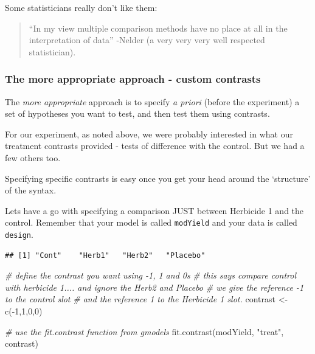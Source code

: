 \documentclass[
]{book}
\newenvironment{Shaded}{\begin{snugshade}}{\end{snugshade}}
\newcommand{\CommentTok}[1]{\textcolor[rgb]{0.56,0.35,0.01}{\textit{#1}}}
\newcommand{\DecValTok}[1]{\textcolor[rgb]{0.00,0.00,0.81}{#1}}
\newcommand{\FunctionTok}[1]{\textcolor[rgb]{0.00,0.00,0.00}{#1}}
\newcommand{\NormalTok}[1]{#1}
\newcommand{\OtherTok}[1]{\textcolor[rgb]{0.56,0.35,0.01}{#1}}
\newcommand{\SpecialCharTok}[1]{\textcolor[rgb]{0.00,0.00,0.00}{#1}}
\newcommand{\StringTok}[1]{\textcolor[rgb]{0.31,0.60,0.02}{#1}}
\begin{document}
Some statisticians really don't like them:

\begin{quote}
``In my view multiple comparison methods have no place at all in the interpretation of data'' -Nelder (a very very very well respected statistician).
\end{quote}

\hypertarget{the-more-appropriate-approach---custom-contrasts}{%
\subsubsection{The more appropriate approach - custom contrasts}\label{the-more-appropriate-approach---custom-contrasts}}

The \emph{more appropriate} approach is to specify \emph{a priori} (before the experiment) a set of hypotheses you want to test, and then test them using contrasts.

For our experiment, as noted above, we were probably interested in what our treatment contrasts provided - tests of difference with the control. But we had a few others too.

Specifying specific contrasts is easy once you get your head around the `structure' of the syntax.

Lets have a go with specifying a comparison JUST between Herbicide 1 and the control. Remember that your model is called \texttt{modYield} and your data is called \texttt{design}.

\begin{Shaded}
\end{Shaded}

\begin{verbatim}
## [1] "Cont"    "Herb1"   "Herb2"   "Placebo"
\end{verbatim}

\begin{Shaded}
\begin{Highlighting}[]
\CommentTok{\# define the contrast you want using {-}1, 1 and 0\textquotesingle{}s}
\CommentTok{\# this says compare control with herbicide 1.... and ignore the Herb2 and Placebo}
\CommentTok{\# we give the reference {-}1 to the control slot}
\CommentTok{\# and the reference 1 to the Herbicide 1 slot.}
\NormalTok{contrast }\OtherTok{\textless{}{-}} \FunctionTok{c}\NormalTok{(}\SpecialCharTok{{-}}\DecValTok{1}\NormalTok{,}\DecValTok{1}\NormalTok{,}\DecValTok{0}\NormalTok{,}\DecValTok{0}\NormalTok{)}

\CommentTok{\# use the fit.contrast function from gmodels}
\FunctionTok{fit.contrast}\NormalTok{(modYield, }\StringTok{"treat"}\NormalTok{, contrast)}
\end{Highlighting}
\end{Shaded}
\end{document}
